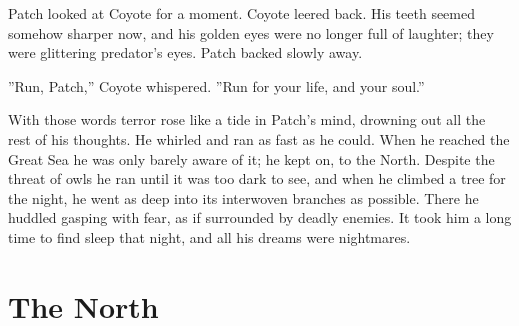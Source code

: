 \documentclass[12pt]{book}
\begin{document}
 Patch looked at Coyote for a moment. Coyote leered back. His teeth seemed somehow sharper now, and his golden eyes were no longer full of laughter; they were glittering predator's eyes. Patch backed slowly away.\par
 ''Run, Patch,'' Coyote whispered. ''Run for your life, and your soul.''\par
 With those words terror rose like a tide in Patch's mind, drowning out all the rest of his thoughts. He whirled and ran as fast as he could. When he reached the Great Sea he was only barely aware of it; he kept on, to the North. Despite the threat of owls he ran until it was too dark to see, and when he climbed a tree for the night, he went as deep into its interwoven branches as possible. There he huddled gasping with fear, as if surrounded by deadly enemies. It took him a long time to find sleep that night, and all his dreams were nightmares.\par

\section{The North}
\end{document}
